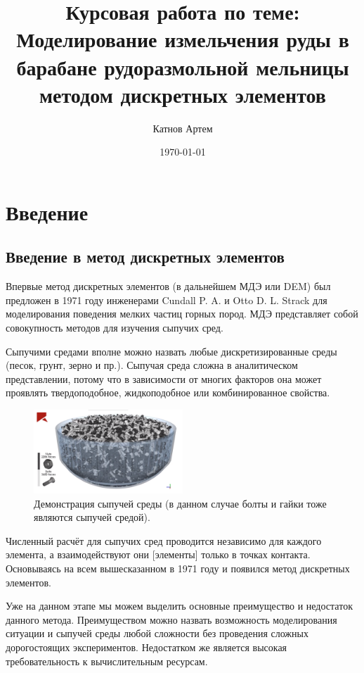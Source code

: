 \documentclass[a4paper]{article}
\author{Катнов Артем}
\title{Курсовая работа по теме: \\ Моделирование измельчения руды в барабане рудоразмольной мельницы методом дискретных элементов}
\date{\today}
\begin{document}
\selectfont
\maketitle
\newpage
\tableofcontents
\newpage

\section{Введение}

\subsection{Введение в метод дискретных элементов}

Впервые метод дискретных элементов (в дальнейшем МДЭ или DEM) был предложен в 1971 году инженерами Cundall P. A. и Otto D. L. Strack \cite{cundall} для моделирования поведения мелких частиц горных пород. 
МДЭ представляет собой совокупность методов для изучения сыпучих сред. 

Сыпучими средами вполне можно назвать любые дискретизированные среды (песок, грунт, зерно и пр.). 
Сыпучая среда сложна в аналитическом представлении, потому что в зависимости от многих факторов она может проявлять твердоподобное, жидкоподобное или комбинированное свойства. 

\begin{figure}[h!]
	\centering
	\includegraphics[width=0.5\textwidth]{sreda}
	\caption{Демонстрация сыпучей среды (в данном случае болты и гайки тоже являются сыпучей средой).}
\end{figure} 

Численный расчёт для сыпучих сред проводится независимо для каждого элемента, а взаимодействуют они [элементы] только в точках контакта. 
Основываясь на всем вышесказанном в 1971 году и появился метод дискретных элементов.

Уже на данном этапе мы можем выделить основные преимущество и недостаток данного метода. 
Преимуществом можно назвать возможность моделирования ситуации и сыпучей среды любой сложности без проведения сложных дорогостоящих экспериментов. 
Недостатком же является высокая требовательность к вычислительным ресурсам.
\end{document}
